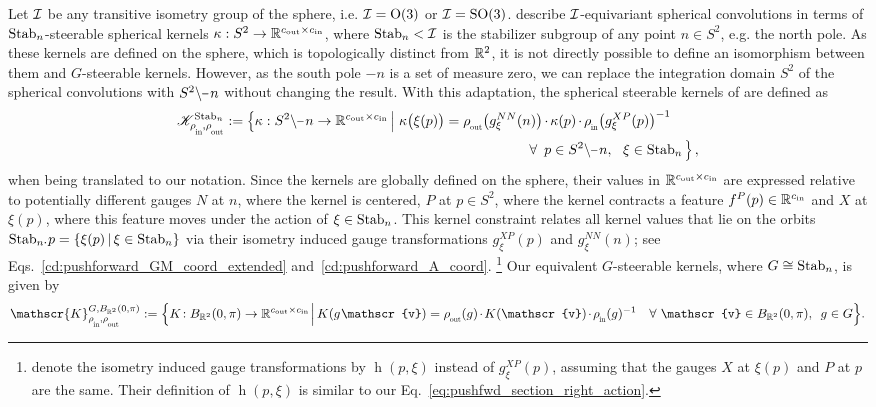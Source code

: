 Let $\mathcal{I}$ be any transitive isometry group of the sphere, i.e. $\mathcal{I}=\operatorname{O}(3)$ or $\mathcal{I}=\operatorname{SO}(3)$.
\citet{Cohen2019-generaltheory} describe $\mathcal{I}$-equivariant spherical convolutions in terms of $\operatorname{Stab}_{n}$-steerable spherical kernels ${\kappa: S^2 \to \mathbb{R}^{{c_\textup{out}}\times{c_\textup{in}}}}$, where $\operatorname{Stab}_{n} < \mathcal{I}$ is the stabilizer subgroup of any point $n\in S^2$, e.g. the north pole.
As these kernels are defined on the sphere, which is topologically distinct from $\mathbb{R}^2$, it is not directly possible to define an isomorphism between them and $G$-steerable kernels.
However, as the south pole $-n$ is a set of measure zero, we can replace the integration domain $S^2$ of the spherical convolutions with $S^2\backslash \mkern-1mu\minus\mkern1mu n$ without changing the result.
With this adaptation, the spherical steerable kernels of \citet{Cohen2019-generaltheory} are defined as
\begin{align}\label{eq:spherical_steerable_kernel_space}
    \mathscr{K}^{\Stab{n}}_{\rhoin\mkern-1mu,\rhoout}
    := \pig\{ \kappa: S^2\backslash \mkern-1mu\minus\mkern1mu n \to \R^{\cout\times\cin}
    \,\pig|\ \kappa\big(\xi (p)\big) = \rhoout\big( g_\xi^{NN}(n) \big) \mkern-1.5mu\cdot\mkern-1.5mu \kappa(p) \mkern-1.5mu\cdot\mkern-1.5mu \rhoin\big( g_\xi^{XP}(p) \big)^{-1}
    \qquad \\ \notag
    \forall\,\ p\in S^2\backslash \mkern-1mu\minus\mkern1mu n,\ \ \xi\in\Stab{n} \pig\} \,,
\end{align}
when being translated to our notation.
Since the kernels are globally defined on the sphere, their values in $\mathbb{R}^{{c_\textup{out}}\times{c_\textup{in}}}$ are expressed relative to potentially different gauges $N$ at $n$, where the kernel is centered, $P$ at $p\in S^2$, where the kernel contracts a feature $f^P(p) \in \mathbb{R}^{c_\textup{in}}$ and $X$ at $\xi(p)$, where this feature moves under the action of $\xi \in \operatorname{Stab}_{n}$.
This kernel constraint relates all kernel values that lie on the orbits ${\operatorname{Stab}_{n}\mkern-4mu.\mkern1mup} = \{ \xi(p) \,|\, \xi\in\operatorname{Stab}_{n} \}$ via their isometry induced gauge transformations $g_\xi^{XP}(p)$ and $g_\xi^{NN}(n)$; see Eqs.~\eqref{cd:pushforward_GM_coord_extended} and~\eqref{cd:pushforward_A_coord}.%
\footnote{
    \citet{Cohen2019-generaltheory} denote the isometry induced gauge transformations by $\operatorname{h}(p,\xi)$ instead of $g_\xi^{XP}(p)$, assuming that the gauges $X$ at $\xi(p)$ and $P$ at $p$ are the same.
    Their definition of $\operatorname{h}(p,\xi)$ is similar to our Eq.~\eqref{eq:pushfwd_section_right_action}.
}
Our equivalent $G$-steerable kernels, where $G \cong \operatorname{Stab}_{n}$, is given by
\begin{align}\label{eq:G_steer_kernel_space_open_ball_pi}
    \mathscr{K}^{G,B_{\R^2}(0,\pi)}_{\rhoin\mkern-1mu,\rhoout}
    := \Big\{ K\!: B_{\R^2}(0,\pi) \to \R^{\cout\times\cin} \mkern1.5mu\Big|\,
    K(g\mkern1mu \mathscr{v}) =
    \rhoout(g) \mkern-2mu\cdot\mkern-2mu K(\mathscr{v}) \mkern-2mu\cdot\mkern-2mu \rhoin(g)^{-1} \ \ \ \forall\ \mathscr{v}\in B_{\R^2}(0,\pi),\,\ g\in G \Big\} .
\end{align}
